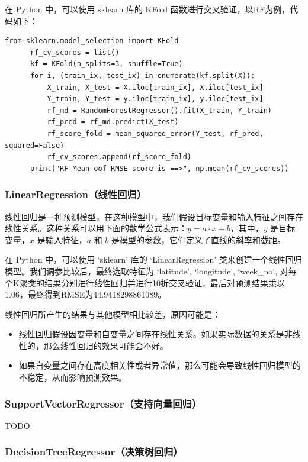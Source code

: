 \documentclass{ctexart}
\begin{document}
在 Python 中，可以使用 sklearn 库的 KFold 函数进行交叉验证，以RF为例，代码如下：

\begin{lstlisting}[style=Python]
      from sklearn.model_selection import KFold
      rf_cv_scores = list()
      kf = KFold(n_splits=3, shuffle=True)
      for i, (train_ix, test_ix) in enumerate(kf.split(X)):
          X_train, X_test = X.iloc[train_ix], X.iloc[test_ix]
          Y_train, Y_test = y.iloc[train_ix], y.iloc[test_ix]
          rf_md = RandomForestRegressor().fit(X_train, Y_train)
          rf_pred = rf_md.predict(X_test)
          rf_score_fold = mean_squared_error(Y_test, rf_pred, squared=False)
          rf_cv_scores.append(rf_score_fold)
      print("RF Mean oof RMSE score is ==>", np.mean(rf_cv_scores))
\end{lstlisting}

\subsubsection{LinearRegression（线性回归）}

线性回归是一种预测模型，在这种模型中，我们假设目标变量和输入特征之间存在线性关系。这种关系可以用下面的数学公式表示：\(y = a \cdot x + b\)，其中，\(y\) 是目标变量，\(x\) 是输入特征，\(a\) 和 \(b\) 是模型的参数，它们定义了直线的斜率和截距。

在 Python 中，可以使用 `sklearn' 库的 `LinearRegression' 类来创建一个线性回归模型。我们调参比较后，最终选取特征为 `latitude', `longitude', `week\_no', 对每个K聚类的结果分别进行线性回归并进行10折交叉验证，最后对预测结果乘以1.06，最终得到RMSE为44.9418298861089。

线性回归所产生的结果与其他模型相比较差，原因可能是：

\begin{itemize}
      \item 线性回归假设因变量和自变量之间存在线性关系。如果实际数据的关系是非线性的，那么线性回归的效果可能会不好。
      \item 如果自变量之间存在高度相关性或者异常值，那么可能会导致线性回归模型的不稳定，从而影响预测效果。
\end{itemize}

\subsubsection{SupportVectorRegressor（支持向量回归）}

TODO

\subsubsection{DecisionTreeRegressor（决策树回归）}
\end{document}
